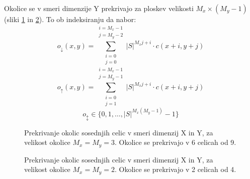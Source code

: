 \documentclass[12pt,a4paper,openany,twoside]{book}
\begin{document}
Okolice se v smeri dimenzije Y prekrivajo za ploskev velikosti \(M_x \times (M_y-1)\) (sliki \ref{overlap_dimension_moore} in \ref{overlap_dimension_quad}).
To ob indeksiranju da nabor:
\begin{equation}
o_{\downarrow}(x,y) = \sum_{\substack{i=0 \\ j=0}}^{\substack{i=M_x-1 \\ j=M_y-2}} |S|^{M_x j + i} \cdot c(x+i,y+j)
\end{equation}
\begin{equation}
o_{\uparrow}(x,y) = \sum_{\substack{i=0 \\ j=1}}^{\substack{i=M_x-1 \\ j=M_y-1}} |S|^{M_x j + i} \cdot c(x+i,y+j)
\end{equation}
\begin{equation}
o_{\updownarrow} \in \{0, 1, \ldots, |S|^{M_x(M_y-1)}-1\}
\end{equation}

\begin{figure}[htb]
\centerline{}
\caption[Prekrivaje okolic \(3 \times 3\) v smeri dimenzij X in Y.]
{Prekrivanje okolic sosednjih celic v smeri dimenzij X in Y, za velikost okolice \(M_x=M_y=3\).
Okolice se prekrivajo v 6 celicah od 9.}
\label{overlap_dimension_moore}
\end{figure}

\begin{figure}[htb]
\centerline{}
\caption[Prekrivaje okolic \(2 \times 2\) v smeri dimenzij X in Y.]
{Prekrivanje okolic sosednjih celic v smeri dimenzij X in Y, za velikost okolice \(M_x=M_y=2\).
Okolice se prekrivajo v 2 celicah od 4.}
\label{overlap_dimension_quad}
\end{figure}
\end{document}
